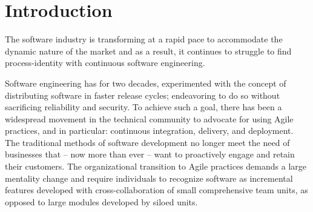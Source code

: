 \documentclass[12pt,a4paper]{article}
\begin{document}

\tableofcontents
\newpage

\section{Introduction}
The software industry is transforming at a rapid pace to accommodate the dynamic nature of the market and as a result, it continues to struggle to find process-identity with continuous software engineering.

Software engineering has for two decades, experimented with the concept of distributing software in faster release cycles; endeavoring to do so without sacrificing reliability and security. To achieve such a goal, there has been a widespread movement in the technical community to advocate for using Agile practices, and in particular: continuous integration, delivery, and deployment. The traditional methods of software development no longer meet the need of businesses that -- now more than ever -- want to proactively engage and retain their customers. The organizational transition to Agile practices demands a large mentality change and require individuals to recognize software as incremental features developed with cross-collaboration of small comprehensive team units, as opposed to large modules developed by siloed units.
\end{document}
